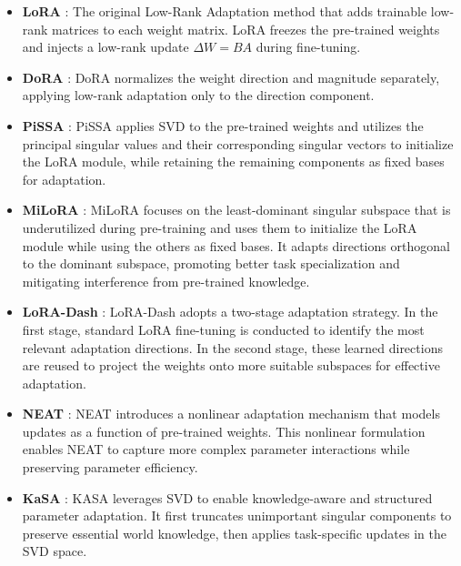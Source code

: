 \documentclass{article}
\theoremstyle{plain}
\theoremstyle{definition}
\theoremstyle{remark}
\begin{document}
\begin{itemize}
  \item \textbf{LoRA} \cite{LORA}: The original Low-Rank Adaptation method that adds trainable low-rank matrices to each weight matrix. LoRA freezes the pre-trained weights and injects a low-rank update $\Delta W = BA$ during fine-tuning.

  \item \textbf{DoRA} \cite{DORA}: DoRA normalizes the weight direction and magnitude separately, applying low-rank adaptation only to the direction component.

  \item \textbf{PiSSA} \cite{PISSA}: PiSSA applies SVD to the pre-trained weights and utilizes the principal singular values and their corresponding singular vectors to initialize the LoRA module, while retaining the remaining components as fixed bases for adaptation. 

  \item \textbf{MiLoRA} \cite{MILORA}: MiLoRA focuses on the least-dominant singular subspace that is underutilized during pre-training and uses them to initialize the LoRA module while using the others as fixed bases. It adapts directions orthogonal to the dominant subspace, promoting better task specialization and mitigating interference from pre-trained knowledge.

  \item \textbf{LoRA-Dash} \cite{LORADASH}: LoRA-Dash adopts a two-stage adaptation strategy. In the first stage, standard LoRA fine-tuning is conducted to identify the most relevant adaptation directions. In the second stage, these learned directions are reused to project the weights onto more suitable subspaces for effective adaptation. 

  \item \textbf{NEAT} \cite{NEAT}: NEAT introduces a nonlinear adaptation mechanism that models updates as a function of pre-trained weights. This nonlinear formulation enables NEAT to capture more complex parameter interactions while preserving parameter efficiency.

  \item \textbf{KaSA} \cite{KASA}: KASA leverages SVD to enable knowledge-aware and structured parameter adaptation. It first truncates unimportant singular components to preserve essential world knowledge, then applies task-specific updates in the SVD space. 
\end{itemize}
\end{document}
